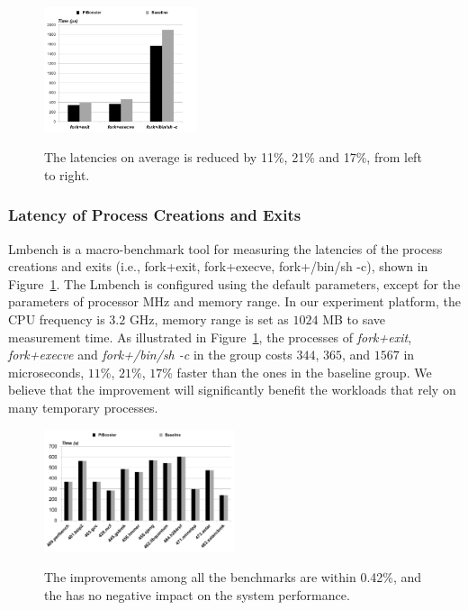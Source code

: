 \begin{figure}[htp]
\centering
\includegraphics[width=0.4\textwidth]{image/macro/lmbench.png} \\
\caption{The latencies on average is reduced by 11\%, 21\% and 17\%, from left to right.}
\label{fig:lmbench}
\end{figure}

\subsubsection{Latency of Process Creations and Exits}
Lmbench is a macro-benchmark tool for measuring the latencies of the process creations and exits (i.e., fork+exit, fork+execve, fork+/bin/sh -c), shown in Figure~\ref{fig:lmbench}.
The Lmbench is configured using the default parameters, except for the parameters of processor MHz and memory range.
In our experiment platform, the CPU frequency is $3.2$ GHz, memory range is set as $1024$ MB to save measurement time.
As illustrated in Figure~\ref{fig:lmbench}, the processes of \emph{fork+exit}, \emph{fork+execve} and \emph{fork+/bin/sh -c} in the \name group costs $344$, $365$, and $1567$ in microseconds, $11$\%, $21$\%, $17$\% faster than the ones in the baseline group.
We believe that the improvement will significantly benefit the workloads that rely on many temporary processes.

\begin{figure}[htp]
\centering
\includegraphics[width=0.5\textwidth]{image/macro/spec.png} \\
\caption{The improvements among all the benchmarks are within 0.42\%, and the \name has no negative impact on the system performance.}
\label{fig:spec}
\end{figure}

